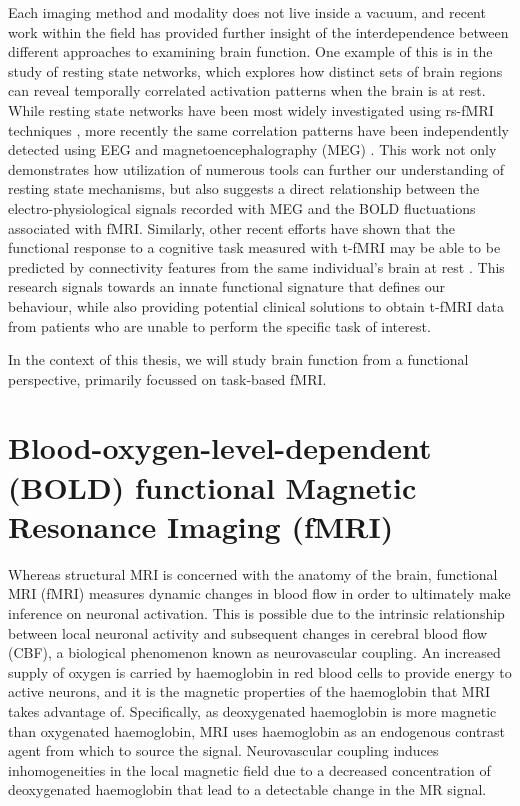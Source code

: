 Each imaging method and modality does not live inside a vacuum, and recent work within the field has provided further insight of the interdependence between different approaches to examining brain function. One example of this is in the study of resting state networks, which explores how distinct sets of brain regions can reveal temporally correlated activation patterns when the brain is at rest. While resting state networks have been most widely investigated using rs-fMRI techniques \citep[e.g.][]{Smith2009-dm, Lee2012-di, Moussa2012-bl}, more recently the same correlation patterns have been independently detected using EEG and magnetoencephalography (MEG) \citep{Brookes2011-cj, Fomina2015-ha}. This work not only demonstrates how utilization of numerous tools can further our understanding of resting state mechanisms, but also suggests a direct relationship between the electro-physiological signals recorded with MEG and the BOLD fluctuations associated with fMRI. Similarly, other recent efforts have shown that the functional response to a cognitive task measured with t-fMRI may be able to be predicted by connectivity features from the same individual's brain at rest \citep{Parker_Jones2017-ld, Tavor2016-pd}. This research signals towards an innate functional signature that defines our behaviour, while also providing potential clinical solutions to obtain t-fMRI data from patients who are unable to perform the specific task of interest.  

In the context of this thesis, we will study brain function from a functional perspective, primarily focussed on task-based fMRI. 

\section{Blood-oxygen-level-dependent (BOLD) functional Magnetic Resonance Imaging (fMRI)}

Whereas structural MRI is concerned with the anatomy of the brain, functional MRI (fMRI) measures dynamic changes in blood flow in order to ultimately make inference on neuronal activation. This is possible due to the intrinsic relationship between local neuronal activity and subsequent changes in cerebral blood flow (CBF), a biological phenomenon known as neurovascular coupling. An increased supply of oxygen is carried by haemoglobin in red blood cells to provide energy to active neurons, and it is the magnetic properties of the haemoglobin that MRI takes advantage of. Specifically, as deoxygenated haemoglobin is more magnetic than oxygenated haemoglobin, MRI uses haemoglobin as an endogenous contrast agent from which to source the signal. Neurovascular coupling induces inhomogeneities in the local magnetic field due to a decreased concentration of deoxygenated haemoglobin that lead to a detectable change in the MR signal.

